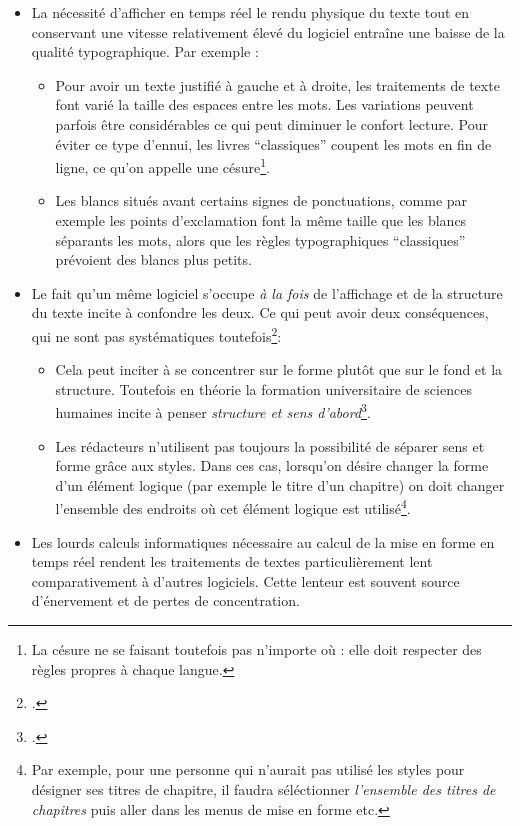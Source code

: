 \begin{itemize}
\item La nécessité d'afficher en temps réel le rendu physique du texte tout en conservant une vitesse relativement élevé du logiciel entraîne une baisse de la qualité typographique. Par exemple :
	\begin{itemize}
		\item Pour avoir un texte justifié à gauche et à droite, les traitements de texte font varié la taille des espaces entre les mots. Les variations peuvent parfois être considérables ce qui peut diminuer le confort lecture. Pour éviter ce type d'ennui, les livres \enquote{classiques} coupent les mots en fin de ligne, ce qu'on appelle une césure\footnote{La césure ne se faisant toutefois pas n'importe où : elle doit respecter des règles propres à chaque langue.}.
		\item Les blancs situés avant certains signes de ponctuations, comme par exemple les points d'exclamation font la même taille que les blancs séparants les mots, alors que les règles typographiques \enquote{classiques} prévoient des blancs plus petits.
	\end{itemize}
\item Le fait qu'un même logiciel s'occupe \emph{à la fois} de l'affichage et de la structure du texte incite à confondre les deux. Ce qui peut avoir deux conséquences, qui ne sont pas systématiques toutefois\footcite[Les auteurs de ces lignes sont moins sévères envers les traitements de texte que d'autres LaTeXien : \cf][]{stupide}:
	\begin{itemize}
		\item Cela peut inciter à se concentrer sur le forme plutôt que sur le fond et la structure. Toutefois en théorie la formation universitaire de sciences humaines incite à penser \emph{structure et sens d'abord}\footcite[Voir un débat sur le blog d'un des auteurs]{structurevsforme}. 
		\item Les rédacteurs n'utilisent pas toujours la possibilité de séparer sens et forme grâce aux styles. Dans ces cas, lorsqu'on désire changer la forme d'un élément logique (par exemple le titre d'un chapitre) on doit changer l'ensemble des endroits où cet élément logique est utilisé\footnote{Par exemple, pour une personne  qui n'aurait pas utilisé les styles pour désigner ses titres de chapitre, il faudra séléctionner \emph{l'ensemble des titres de chapitres} puis aller dans les menus de mise en forme etc.}.
	\end{itemize}

\item Les lourds calculs informatiques nécessaire au calcul de la mise en forme en temps réel rendent les traitements de textes particulièrement lent comparativement à d'autres logiciels. Cette lenteur est souvent source d'énervement et de pertes de concentration.
\end{itemize}

